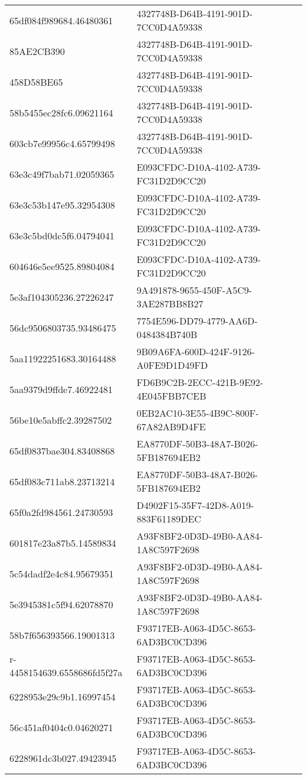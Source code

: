 \begin{tabular}{ll}
65df084f989684.46480361 & 4327748B-D64B-4191-901D-7CC0D4A59338 \\
85AE2CB390 & 4327748B-D64B-4191-901D-7CC0D4A59338 \\
458D58BE65 & 4327748B-D64B-4191-901D-7CC0D4A59338 \\
58b5455ec28fc6.09621164 & 4327748B-D64B-4191-901D-7CC0D4A59338 \\
603cb7e99956c4.65799498 & 4327748B-D64B-4191-901D-7CC0D4A59338 \\
63e3c49f7bab71.02059365 & E093CFDC-D10A-4102-A739-FC31D2D9CC20 \\
63e3c53b147e95.32954308 & E093CFDC-D10A-4102-A739-FC31D2D9CC20 \\
63e3c5bd0dc5f6.04794041 & E093CFDC-D10A-4102-A739-FC31D2D9CC20 \\
604646e5ee9525.89804084 & E093CFDC-D10A-4102-A739-FC31D2D9CC20 \\
5e3af104305236.27226247 & 9A491878-9655-450F-A5C9-3AE287BB8B27 \\
56dc9506803735.93486475 & 7754E596-DD79-4779-AA6D-0484384B740B \\
5aa11922251683.30164488 & 9B09A6FA-600D-424F-9126-A0FE9D1D49FD \\
5aa9379d9ffde7.46922481 & FD6B9C2B-2ECC-421B-9E92-4E045FBB7CEB \\
56be10e5abffc2.39287502 & 0EB2AC10-3E55-4B9C-800F-67A82AB9D4FE \\
65df0837bae304.83408868 & EA8770DF-50B3-48A7-B026-5FB187694EB2 \\
65df083c711ab8.23713214 & EA8770DF-50B3-48A7-B026-5FB187694EB2 \\
65f0a2fd984561.24730593 & D4902F15-35F7-42D8-A019-883F61189DEC \\
601817e23a87b5.14589834 & A93F8BF2-0D3D-49B0-AA84-1A8C597F2698 \\
5c54dadf2e4c84.95679351 & A93F8BF2-0D3D-49B0-AA84-1A8C597F2698 \\
5e3945381c5f94.62078870 & A93F8BF2-0D3D-49B0-AA84-1A8C597F2698 \\
58b7f656393566.19001313 & F93717EB-A063-4D5C-8653-6AD3BC0CD396 \\
r-4458154639.6558686fd5f27a & F93717EB-A063-4D5C-8653-6AD3BC0CD396 \\
6228953e29c9b1.16997454 & F93717EB-A063-4D5C-8653-6AD3BC0CD396 \\
56c451af0404c0.04620271 & F93717EB-A063-4D5C-8653-6AD3BC0CD396 \\
6228961dc3b027.49423945 & F93717EB-A063-4D5C-8653-6AD3BC0CD396 \\

\end{tabular}
